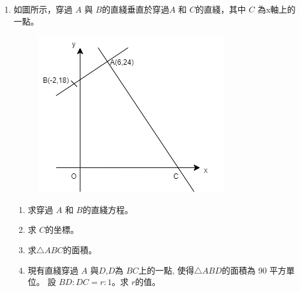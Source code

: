 \documentclass[11pt]{article}
\begin{document}
\begin{enumerate}
            \hrulefill
            
            \hrulefill
            
            \hrulefill
            
            \hrulefill
            
            \hrulefill
            
            \hrulefill
            
            \hrulefill
            
            \hrulefill
            
            \hrulefill
            
            \hrulefill

        \pagebreak
        \item 如圖所示，穿過 $A$ 與 $B$的直綫垂直於穿過$A$ 和 $C$的直綫，其中 $C$ 為x軸上的一點。\begin{figure}[H]
            \centering
            \includegraphics[scale=0.6]{f4finalq5.png}
        \end{figure}\begin{enumerate}
            \item 求穿過 $A$ 和 $B$的直綫方程。
            \item 求 $C$的坐標。
            \item 求$\triangle ABC$的面積。
            \item 現有直綫穿過 $A$ 與$D$,$D$為 $BC$上的一點, 使得$\triangle ABD$的面積為 90 平方單位。 設 $BD:DC=r:1$。求 $r$的值。
        \end{enumerate}
        \hrulefill
                    
            \hrulefill

            \hrulefill
            
            \hrulefill
        

\end{enumerate}
\end{document}
